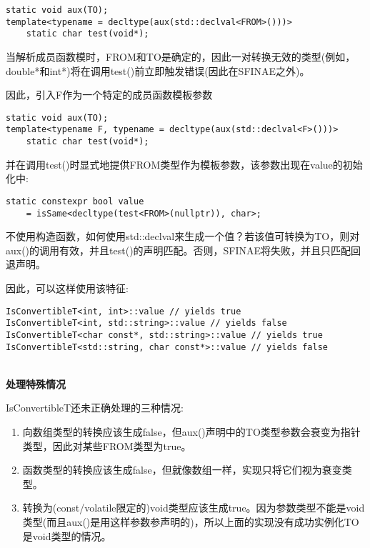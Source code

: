 \begin{lstlisting}[style=styleCXX]
static void aux(TO);
template<typename = decltype(aux(std::declval<FROM>()))>
	static char test(void*);
\end{lstlisting}

当解析成员函数模时，FROM和TO是确定的，因此一对转换无效的类型(例如，double*和int*)将在调用test()前立即触发错误(因此在SFINAE之外)。

因此，引入F作为一个特定的成员函数模板参数

\begin{lstlisting}[style=styleCXX]
static void aux(TO);
template<typename F, typename = decltype(aux(std::declval<F>()))>
	static char test(void*);
\end{lstlisting}

并在调用test()时显式地提供FROM类型作为模板参数，该参数出现在value的初始化中:

\begin{lstlisting}[style=styleCXX]
static constexpr bool value
	= isSame<decltype(test<FROM>(nullptr)), char>;
\end{lstlisting}

不使用构造函数，如何使用std::declval来生成一个值？若该值可转换为TO，则对aux()的调用有效，并且test()的声明匹配。否则，SFINAE将失败，并且只匹配回退声明。

因此，可以这样使用该特征:

\begin{lstlisting}[style=styleCXX]
IsConvertibleT<int, int>::value // yields true
IsConvertibleT<int, std::string>::value // yields false
IsConvertibleT<char const*, std::string>::value // yields true
IsConvertibleT<std::string, char const*>::value // yields false
\end{lstlisting}

\hspace*{\fill} \\ %
\noindent
\textbf{处理特殊情况}

IsConvertibleT还未正确处理的三种情况:

\begin{enumerate}
\item
向数组类型的转换应该生成false，但aux()声明中的TO类型参数会衰变为指针类型，因此对某些FROM类型为true。

\item
函数类型的转换应该生成false，但就像数组一样，实现只将它们视为衰变类型。

\item
转换为(const/volatile限定的)void类型应该生成true。因为参数类型不能是void类型(而且aux()是用这样参数参声明的)，所以上面的实现没有成功实例化TO是void类型的情况。
\end{enumerate}

